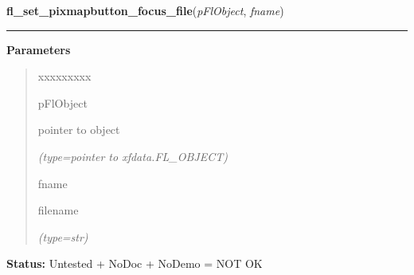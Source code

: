 \hspace{.8\funcindent}\begin{boxedminipage}{\funcwidth}

    \raggedright \textbf{fl\_set\_pixmapbutton\_focus\_file}(\textit{pFlObject}, \textit{fname})

    \vspace{-1.5ex}

    \rule{\textwidth}{0.5\fboxrule}
\setlength{\parskip}{2ex}
\setlength{\parskip}{1ex}
      \textbf{Parameters}
      \vspace{-1ex}

      \begin{quote}
        \begin{Ventry}{xxxxxxxxx}

          \item[pFlObject]

          pointer to object

            {\it (type=pointer to xfdata.FL\_OBJECT)}

          \item[fname]

          filename

            {\it (type=str)}

        \end{Ventry}

      \end{quote}

\textbf{Status:} Untested + NoDoc + NoDemo = NOT OK



    \end{boxedminipage}

    \label{xformslib:flbutton:fl_set_pixmapbutton_focus_pixmap}

    \vspace{0.5ex}

